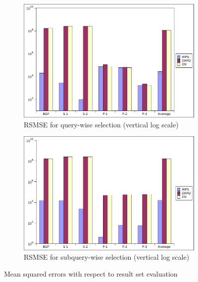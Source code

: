 \documentclass{sig-alternate}  %
\begin{document}
\begin{figure}
\centering
\begin{subfigure}[b]{0.45\textwidth}
                \centering
\includegraphics[width=\textwidth]{img/querywise_rse}
                \caption{RSMSE for query-wise selection (vertical log scale)}
                \label{fig:rsmseQuery}
        \end{subfigure}
\begin{subfigure}[b]{0.45\textwidth}
                \centering
\includegraphics[width=\textwidth]{img/subquerywise_rse}
                \caption{RSMSE for subquery-wise selection (vertical log scale)}
                \label{fig:rsmseSubquery}
        \end{subfigure}
\caption{Mean squared errors with respect to result set evaluation}
\label{fig:rsmse}
\end{figure}
\end{document}
